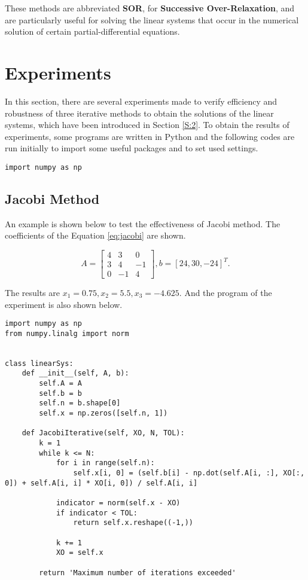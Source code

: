 \documentclass[preprint,12pt]{elsarticle}
\begin{document}
These methods are abbreviated \textbf{SOR}, for \textbf{Successive Over-Relaxation}, and are particularly useful for solving the linear systems that occur in the numerical solution of certain partial-differential equations.

\section{Experiments}
\label{S:3}

In this section, there are several experiments made to verify efficiency and robustness of three iterative methods to obtain the solutions of the linear systems, which have been introduced in Section \ref{S:2}. To obtain the results of experiments, some programs are written in Python and the following codes are run initially to import some useful packages and to set used settings.

\begin{lstlisting}
import numpy as np
\end{lstlisting}

\subsection{Jacobi Method}
\label{SS:3.1}

An example is shown below to test the effectiveness of Jacobi method. The coefficients of the Equation \ref{eq:jacobi} are shown.

\begin{equation}
\label{eq:jacobi}
  A = 
  \begin{bmatrix}
    4 & 3 & 0 \\ 
    3 & 4 & -1 \\
    0 & -1 & 4
  \end{bmatrix},
  b = [24, 30, -24]^T.
\end{equation}

The results are $x_1 = 0.75, x_2 = 5.5, x_3 = -4.625$. And the program of the experiment is also shown below.

\begin{lstlisting}
import numpy as np
from numpy.linalg import norm


class linearSys:
    def __init__(self, A, b):
        self.A = A
        self.b = b
        self.n = b.shape[0]
        self.x = np.zeros([self.n, 1])
    
    def JacobiIterative(self, XO, N, TOL):
        k = 1
        while k <= N:
            for i in range(self.n):
                self.x[i, 0] = (self.b[i] - np.dot(self.A[i, :], XO[:, 0]) + self.A[i, i] * XO[i, 0]) / self.A[i, i]
            
            indicator = norm(self.x - XO)
            if indicator < TOL:
                return self.x.reshape((-1,))
            
            k += 1
            XO = self.x
        
        return 'Maximum number of iterations exceeded'
\end{lstlisting}
\end{document}
